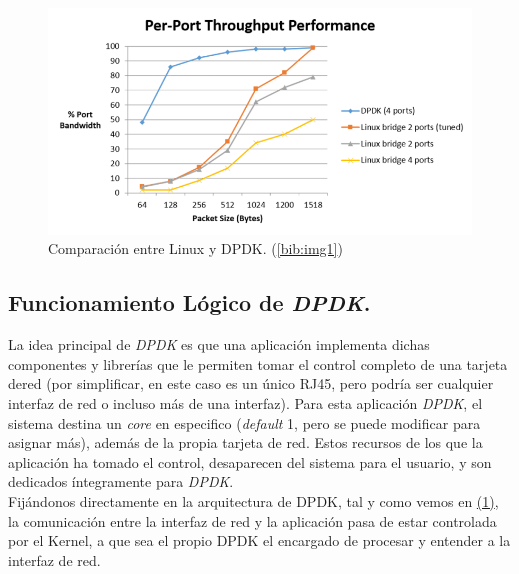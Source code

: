 \documentclass[12pt]{article}
\begin{document}
    \begin{figure}[h]
        \begin{center}
        \includegraphics[width=1\textwidth]{img/TB_per-port-throughput-performance-800x428.png}
        \caption{Comparación entre Linux y DPDK. (\ref{bib:img1})}
        \end{center}
    \end{figure}
    
    \pagebreak
    
    \subsection{Funcionamiento Lógico de \textit{DPDK}.}
    \noindent La idea principal de \textit{DPDK} es que una aplicación implementa dichas componentes y librerías que le permiten tomar el control completo de una tarjeta dered  (por simplificar, en este caso es un único RJ45, pero podría ser cualquier interfaz de red o incluso más de una interfaz). Para esta aplicación \textit{DPDK}, el sistema destina un \textit{core} en especifico (\textit{default} 1, pero se puede modificar para asignar más), además de la propia tarjeta de red. Estos recursos de los que la aplicación ha tomado el control, desaparecen del sistema para el usuario, y son dedicados íntegramente para \textit{DPDK}. \\
    
    \noindent Fijándonos directamente en la arquitectura de DPDK, tal y como vemos en \hyperref[bib:link1]{(1)}, la comunicación entre la interfaz de red y la aplicación pasa de estar controlada por el Kernel, a que sea el propio DPDK el encargado de procesar y entender a la interfaz de red. 
    
\end{document}
